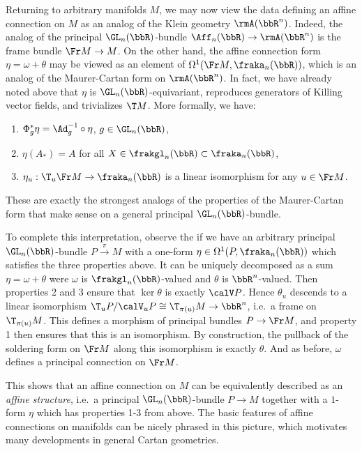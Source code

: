 \begin{rem}\label{rem 1.3.6 Cap}
    Returning to arbitrary manifolds $M$, we may now view the data defining an affine connection on $M$ as an analog of the Klein geometry $\rmA(\bbR^n)$. Indeed, the analog of the principal $\GL_n(\bbR)$-bundle $\Aff_n(\bbR)\to \rmA(\bbR^n)$ is the frame bundle $\Fr M\to M$. On the other hand, the affine connection form $\eta=\omega+\theta$ may be viewed as an element of $\Omega^1(\Fr M,\fraka_n(\bbR))$, which is an analog of the Maurer-Cartan form on $\rmA(\bbR^n)$. In fact, we have already noted above that $\eta$ is $\GL_n(\bbR)$-equivariant, reproduces generators of Killing vector fields, and trivializes $\T M$. More formally, we have:
    \begin{enumerate}
        \item $\Phi_g^\ast \eta=\Ad_g^{-1}\circ \eta$, $g\in\GL_n(\bbR)$,
        \item $\eta(A_\ast)=A$ for all $X\in\frakgl_n(\bbR)\subset\fraka_n(\bbR)$,
        \item $\eta_u:\T_u\Fr M\to \fraka_n(\bbR)$ is a linear isomorphism for any $u\in\Fr M$.
    \end{enumerate}
    These are exactly the strongest analogs of the properties of the Maurer-Cartan form that make sense on a general principal $\GL_n(\bbR)$-bundle.

    To complete this interpretation, observe the if we have an arbitrary principal $\GL_n(\bbR)$-bundle $P\overset{\pi}{\to}M$ with a one-form $\eta\in\Omega^1(P,\fraka_n(\bbR))$ which satisfies the three properties above. It can be uniquely decomposed as a sum $\eta=\omega+\theta$ were $\omega$ is $\frakgl_n(\bbR)$-valued and $\theta$ is $\bbR^n$-valued. Then properties 2 and 3 ensure that $\ker\theta$ is exactly $\calV P$. Hence $\theta_u$ descends to a linear isomorphism $\T_u P\slash \calV_u P\cong \T_{\pi(u)}M\to \bbR^n$, i.e.\ a frame on $\T_{\pi(u)}M$. This defines a morphism of principal bundles $P\to \Fr M$, and property 1 then ensures that this is an isomorphism. By construction, the pullback of the soldering form on $\Fr M$ along this isomorphism is exactly $\theta$. And as before, $\omega$ defines a principal connection on $\Fr M$.

    This shows that an affine connection on $M$ can be equivalently described as an \emph{affine structure}, i.e.\ a principal $\GL_n(\bbR)$-bundle $P\to M$ together with a $1$-form $\eta$ which has properties 1-3 from above. The basic features of affine connections on manifolds can be nicely phrased in this picture, which motivates many developments in general Cartan geometries.
\end{rem}



